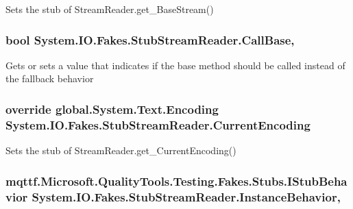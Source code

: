 Sets the stub of Stream\-Reader.\-get\-\_\-\-Base\-Stream()

\hypertarget{class_system_1_1_i_o_1_1_fakes_1_1_stub_stream_reader_a77247f8ffea56da95ab41121b75c8250}{
\subsubsection[{Call\-Base}]{\setlength{\rightskip}{0pt plus 5cm}bool System.\-I\-O.\-Fakes.\-Stub\-Stream\-Reader.\-Call\-Base\hspace{0.3cm}{\ttfamily [get]}, {\ttfamily [set]}}}\label{class_system_1_1_i_o_1_1_fakes_1_1_stub_stream_reader_a77247f8ffea56da95ab41121b75c8250}


Gets or sets a value that indicates if the base method should be called instead of the fallback behavior

\hypertarget{class_system_1_1_i_o_1_1_fakes_1_1_stub_stream_reader_af836c82c867728770939ff5683279809}{
\subsubsection[{Current\-Encoding}]{\setlength{\rightskip}{0pt plus 5cm}override global.\-System.\-Text.\-Encoding System.\-I\-O.\-Fakes.\-Stub\-Stream\-Reader.\-Current\-Encoding\hspace{0.3cm}{\ttfamily [get]}}}\label{class_system_1_1_i_o_1_1_fakes_1_1_stub_stream_reader_af836c82c867728770939ff5683279809}


Sets the stub of Stream\-Reader.\-get\-\_\-\-Current\-Encoding()

\hypertarget{class_system_1_1_i_o_1_1_fakes_1_1_stub_stream_reader_ab598a61bffe62ff1ce91f3219288a2a7}{
\subsubsection[{Instance\-Behavior}]{\setlength{\rightskip}{0pt plus 5cm}mqttf.\-Microsoft.\-Quality\-Tools.\-Testing.\-Fakes.\-Stubs.\-I\-Stub\-Behavior System.\-I\-O.\-Fakes.\-Stub\-Stream\-Reader.\-Instance\-Behavior\hspace{0.3cm}{\ttfamily [get]}, {\ttfamily [set]}}}\label{class_system_1_1_i_o_1_1_fakes_1_1_stub_stream_reader_ab598a61bffe62ff1ce91f3219288a2a7}


